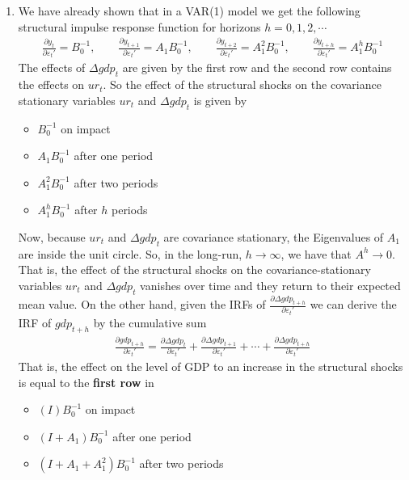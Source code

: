 \begin{enumerate}
\item We have already shown that in a VAR{(1)} model we get the following structural impulse response function for horizons \(h=0,1,2,\cdots \)
\begin{align*}
\frac{\partial y_{t}}{\partial \varepsilon_{t}'} = B_{0}^{-1}
,\qquad
\frac{\partial y_{t+1}}{\partial \varepsilon_{t}'} = A_{1} B_{0}^{-1}
,\qquad
\frac{\partial y_{t+2}}{\partial \varepsilon_{t}'} = A^{2}_{1} B_{0}^{-1}
,\qquad
\frac{\partial y_{t+h}}{\partial \varepsilon_{t}'} = A^{h}_{1} B_{0}^{-1}
\end{align*}
The effects of \(\Delta {gdp}_{t}\) are given by the first row and the second row contains the effects on \({ur}_{t}\).
So the effect of the structural shocks on the covariance stationary variables \({ur}_{t}\) and \(\Delta {gdp}_{t}\) is given by
\begin{itemize}
\item \(B_{0}^{-1}\) on impact
\item \(A_{1} B_{0}^{-1}\) after one period
\item \(A_{1}^{2} B_{0}^{-1}\) after two periods
\item \(A_{1}^{h} B_{0}^{-1}\) after \(h\) periods
\end{itemize}
Now, because \({ur}_{t}\) and \(\Delta {gdp}_{t}\) are covariance stationary,
  the Eigenvalues of \(A_{1}\) are inside the unit circle.
So, in the long-run, \(h\rightarrow \infty \), we have that \(A^{h}\rightarrow 0\).
That is, the effect of the structural shocks on the covariance-stationary variables \({ur}_{t}\) and \(\Delta {gdp}_{t}\)
  vanishes over time and they return to their expected mean value.
On the other hand, given the IRFs of \(\frac{\partial \Delta {gdp}_{t+h}}{\partial \varepsilon_{t}'}\)
  we can derive the IRF of \({gdp}_{t+h}\) by the cumulative sum
\begin{align*}
\frac{\partial {gdp}_{t+h}}{\partial \varepsilon_{t}'}
=
\frac{\partial \Delta {gdp}_{t}}{\partial \varepsilon_{t}'}
+ \frac{\partial \Delta {gdp}_{t+1}}{\partial \varepsilon_{t}'}
+ \cdots
+ \frac{\partial \Delta {gdp}_{t+h}}{\partial \varepsilon_{t}'}
\end{align*}
That is, the effect on the level of GDP to an increase in the structural shocks is equal to the \textbf{first row} in
\begin{itemize}
\item \((I)B_{0}^{-1}\) on impact
\item \((I+A_{1}) B_{0}^{-1}\) after one period
\item \((I+A_{1}+A_{1}^{2}) B_{0}^{-1}\) after two periods

\end{itemize}
\end{enumerate}
